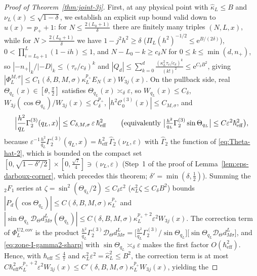 \documentclass[11pt]{article}
\theoremstyle{definition}
\theoremstyle{remark}
\newcommand{\cD}{\mathcal{D}}
\newcommand{\cC}{\mathcal{C}}
\newcommand{\heff}{\hbar_{\mathrm{eff}}}
\renewcommand{\_}{\oldunderscore\penalty0\hskip0pt\relax}
\begin{document}
\begin{proof}[Proof of Theorem~\ref{thm:joint-3j}]
First, at any physical point with $\hat{\kappa}_L\le B$ and $\nu_L(x)\le\sqrt{1-\delta}$, we establish an explicit sup bound
  valid down to $u(x)=p_++1$: for $N\le\frac{2(L_0+1)}{\delta}$ there are finitely many triples $(N,L,x)$, while for
  $N>\frac{2(L_0+1)}{\delta}$ we have $1-j^2 h^2\ge\delta$ ($\Pi_L(h^2)^{-1/2}\le\mathrm{e}^{B/(2\delta)}$),
  $0<\prod_{i=L_0+1}^L(1-ih)\le 1$, and $N-L_0-k\ge c_\delta N$ for $0\le k\le\min(d,n_+)$, so
  $|-n_+|_k/|-D|_k\le(\tau_v/c_\delta)^k$ and
  $|Q_d|\le\sum_{k=0}^d\frac{(\kappa_L^2\tau_v/c_\delta)^k}{(k!)^2}\le\mathrm{e}^{C_\delta B^2}$, giving $|\Phi_L^{M,\sigma}|\le
  C_1(\delta,B,M,\sigma)\kappa_L^{p_+}E_N(x)W_{3j}(x)$. On the pullback side, real $\Theta_{q_L}(x)\in[\theta,\frac{\pi}{2}]$
  satisfies $\Theta_{q_L}(x)\asymp_\delta\varepsilon$, so $W_{q_L}(x)\le C_\delta$, $W_{3j}(\cos\Theta_{q_L})/W_{3j}(x)\le
  C_\delta^{p_+}$, $|h^2\cC_0^{(3)}(x)|\le C_{M,\sigma}$, and
\begin{equation}
  \Bigl|\frac{h^2}{q_L}\Gamma_2^{(3)}(q_L,x)\Bigr|\le C_{\delta,M,\sigma}\,\varepsilon\,\heff^2
  \qquad\bigl(\text{equivalently }\bigl|\tfrac{h^2}{q_L}\Gamma_2^{(3)}\sin\Theta_{q_L}\bigr|\le C\varepsilon^2\heff^2\bigr),
  \label{eq:zone-I-gamma2-sharp}
\end{equation}
  because $\varepsilon^{-1}\frac{h^2}{q_L}\Gamma_2^{(3)}(q_L,x)=\heff^2\,\widehat\Gamma_2(\nu_L,\varepsilon)$ with $\widehat\Gamma_2$ the function of \eqref{eq:Theta-hat-2}, which is bounded on the compact set $[0,\sqrt{1-\delta'/2}]\times[0,\frac{\sqrt7}{4}]\ni(\nu_L,\varepsilon)$ (Step~1 of the proof of Lemma~\ref{lem:eps-darboux-corner}, which precedes this theorem; $\delta'=\min(\delta,\frac12)$).  Summing the ${}_2F_1$ series at $\zeta=\sin^2(\Theta_{q_L}/2)\le
  C_\delta\varepsilon^2$ ($\kappa_L^2\zeta\le C_\delta B^2$) bounds $|P_d(\cos\Theta_{q_L})|\le
  C(\delta,B,M,\sigma)\kappa_L^{p_+}$ and $|\sin\Theta_{q_L}\,\cD_\Theta d^L_{M\sigma}(\Theta_{q_L})|\le
  C(\delta,B,M,\sigma)\kappa_L^{p_++2}\varepsilon^2 W_{3j}(x)$.  The correction term of $\Phi^{\mathrm{U2,cov}}_L$ is the product $\frac{h^2}{q_L}\Gamma_2^{(3)}\cD_\Theta d^L_{M\sigma}=\bigl[\frac{h^2}{q_L}\Gamma_2^{(3)}/\sin\Theta_{q_L}\bigr]\bigl[\sin\Theta_{q_L}\cD_\Theta d^L_{M\sigma}\bigr]$, and \eqref{eq:zone-I-gamma2-sharp} with $\sin\Theta_{q_L}\asymp_\delta\varepsilon$ makes the first factor $O(\heff^2)$.  Hence, with $\heff\le\frac47$ and $\kappa_L^2\varepsilon^2=\hat\kappa_L^2\le B^2$, the correction term is at most $C\heff^2\kappa_L^{p_++2}\varepsilon^2W_{3j}(x)\le C'(\delta,B,M,\sigma)\kappa_L^{p_+}W_{3j}(x)$, yielding the

\end{proof}
\end{document}
